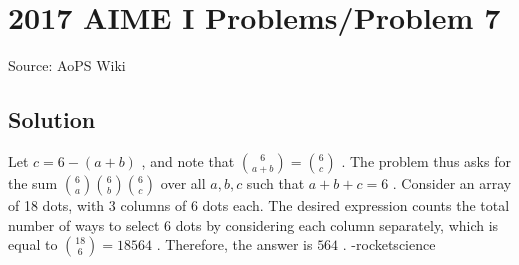\documentclass[12pt]{article}
\begin{document}
\section*{{2017 AIME I Problems/Problem 7}}
Source: AoPS Wiki

\subsection*{Solution}
Let $c=6-(a+b)$ , and note that $\binom{6}{a + b}=\binom{6}{c}$ . The problem thus asks for the sum $\binom{6}{a} \binom{6}{b} \binom{6}{c}$ over all $a,b,c$ such that $a+b+c=6$ . Consider an array of 18 dots, with 3 columns of 6 dots each. The desired expression counts the total number of ways to select 6 dots by considering each column separately, which is equal to $\binom{18}{6}=18564$ . Therefore, the answer is $\boxed{564}$ . -rocketscience
\end{document}
